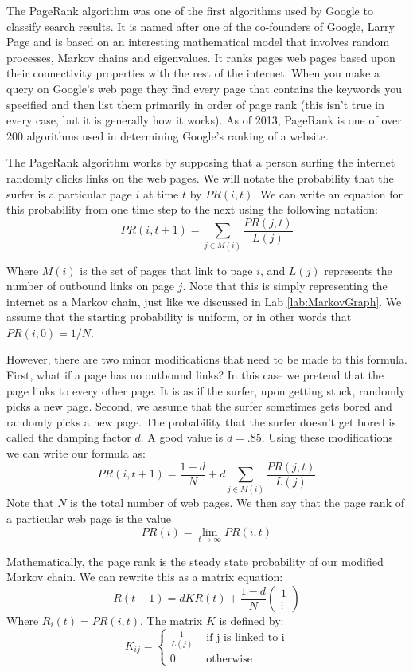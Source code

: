 \label{lab:PageRank}

The PageRank algorithm was one of the first algorithms used by Google to classify search results.
It is named after one of the co-founders of Google, Larry Page and is based on an interesting mathematical model that involves random processes, Markov chains and eigenvalues.
It ranks pages web pages based upon their connectivity properties with the rest of the internet.
When you make a query on Google's web page they find every page that contains the keywords you specified and then list them primarily in order of page rank (this isn't true in every case, but it is generally how it works).
As of 2013, PageRank is one of over 200 algorithms used in determining Google's ranking of a website.

The PageRank algorithm works by supposing that a person surfing the internet randomly clicks links on the web pages.
We will notate the probability that the surfer is a particular page $i$ at time $t$ by $PR(i,t)$.
We can write an equation for this probability from one time step to the next using the following notation:
\[PR(i,t+1) = \sum_{j \in M(i)} \frac{PR(j,t)}{L(j)}\]

Where $M(i)$ is the set of pages that link to page $i$, and $L(j)$ represents the number of outbound links on page $j$.
Note that this is simply representing the internet as a Markov chain, just like we discussed in Lab \ref{lab:MarkovGraph}.
We assume that the starting probability is uniform, or in other words that $PR(i,0) = 1/N$.

However, there are two minor modifications that need to be made to this formula.
First, what if a page has no outbound links?
In this case we pretend that the page links to every other page.
It is as if the surfer, upon getting stuck, randomly picks a new page.
Second, we assume that the surfer sometimes gets bored and randomly picks a new page.
The probability that the surfer doesn't get bored is called the damping factor $d$.
A good value is $d=.85$.
Using these modifications we can write our formula as:
\[
PR(i,t+1) = \frac{1-d}{N} + d\sum_{j \in M(i)} \frac{PR(j,t)}{L(j)}
\]
Note that $N$ is the total number of web pages.
We then say that the page rank of a particular web page is the value
\[PR(i) = \lim_{t\to \infty} PR(i,t)\]

Mathematically, the page rank is the steady state probability of our modified Markov chain.
We can rewrite this as a matrix equation:
\[R(t+1) = d K R(t) + \frac{1-d}{N} \begin{pmatrix}1\\\vdots\end{pmatrix}\]
Where $R_i(t) = PR(i,t)$.
The matrix $K$ is defined by:
\[K_{ij} = \begin{cases} \frac{1}{L(j)} & \mbox{ if j is linked to i} \\ 0 & \mbox{ otherwise} \end{cases}\]

